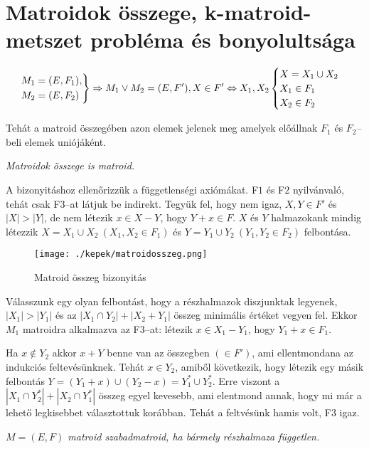 \section{Matroidok összege, k-matroid-metszet probléma és bonyolultsága}

\[
\begin{rcases}
M_1=(E,F_1), \\
M_2=(E,F_2)
\end{rcases} 
\Rightarrow
M_1 \vee M_2  = (E,F'), X \in F' \Leftrightarrow X_1, X_2 
\begin{cases}
X=X_1 \cup X_2 \\
X_1 \in F_1\\
X_2 \in F_2
\end{cases}
\]

Tehát a matroid összegében azon elemek jelenek meg amelyek előállnak $F_1$ és
$F_2$--beli elemek uniójáként. 

\vspace{0.4cm}
\emph{Matroidok összege is matroid.}
\vspace{0.4cm}

A bizonyitáshoz ellenőrizzük a függetlenségi axiómákat. F$1$ és F$2$
nyilvánvaló, tehát csak F$3$--at látjuk be indirekt. Tegyük fel, hogy nem igaz, $X,Y \in F'$
és $|X|>|Y|$, de nem létezik $x \in X-Y$, hogy $Y+x \in F$. $X$ és $Y$
halmazokank mindig létezzik $X=X_1 \cup X_2~(X_1, X_2 \in F_1)$ és $Y=Y_1 \cup
Y_2~(Y_1, Y_2 \in F_2)$ felbontása.

\begin{figure}[htbp]
\centering
\texttt{[image: ./kepek/matroidosszeg.png]}
\caption{Matroid összeg bizonyitás}\label{fig:Unif}
\end{figure}

Válasszunk egy olyan felbontást, hogy a részhalmazok diszjunktak legyenek,
$|X_1|>|Y_1|$ és az $|X_1 \cap Y_2|+|X_2+Y_1|$ összeg minimális értéket vegyen
fel. Ekkor $M_1$ matroidra alkalmazva az F$3$--at: létezik $x \in X_1-Y_1$,
hogy $Y_1+x \in F_1$.

Ha $x \not \in Y_2$ akkor $x+Y $ benne van az összegben $(\in F')$, ami
ellentmondana az indukciós feltevésünknek. Tehát $x \in Y_2$, amiből következik,
hogy létezik egy másik felbontás $Y=(Y_1+x) \cup (Y_2 -x)=Y_1^* \cup Y_2^*$.
Erre viszont a $|X_1\cap Y_2^*|+|X_2 \cap Y_1^*|$ összeg egyel kevesebb, ami
elentmond annak, hogy mi már a lehető legkisebbet választottuk korábban. Tehát a
feltvésünk hamis volt, F$3$ igaz.

\vspace{0.4cm}
\emph{$M=(E,F)$ matroid szabadmatroid, ha bármely részhalmaza független.}

